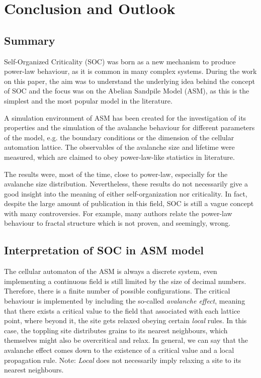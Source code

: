 \chapter{Conclusion and Outlook}
\thispagestyle{fancy}

\section{Summary}
Self-Organized Criticality (SOC) was born as a new mechanism to produce power-law behaviour, as it is common in many complex systems. During the work on this paper, the aim was to understand the underlying idea behind the concept of SOC and the focus was on the Abelian Sandpile Model (ASM), as this is the simplest and the most popular model in the literature.

A simulation environment of ASM has been created for the investigation of its properties and the simulation of the avalanche behaviour for different parameters of the model, e.g. the boundary conditions or the dimension of the cellular automation lattice. The observables of the avalanche size and lifetime were measured, which are claimed to obey power-law-like statistics in literature.

The results were, most of the time, close to power-law, especially for the avalanche size distribution. Nevertheless, these results do not necessarily give a good insight into the meaning of either self-organization nor criticality. In fact, despite the large amount of publication in this field, SOC is still a vague concept with many controversies. For example, many authors relate the power-law behaviour to fractal structure which is not proven, and seemingly, wrong.


\section{Interpretation of SOC in ASM model}
The cellular automaton of the ASM is always a discrete system, even implementing a continuous field is still limited by the size of decimal numbers. Therefore, there is a finite number of possible configurations. The critical behaviour is implemented by including the so-called \emph{avalanche effect}, meaning that there exists a critical value to the field that associated with each lattice point, where beyond it, the site gets relaxed obeying certain \emph{local} rules. In this case, the toppling site distributes grains to its nearest neighbours, which themselves might also be overcritical and relax. In general, we can say that the avalanche effect comes down to the existence of a critical value and a local propagation rule. Note: \emph{Local} does not necessarily imply relaxing a site to its nearest neighbours.

